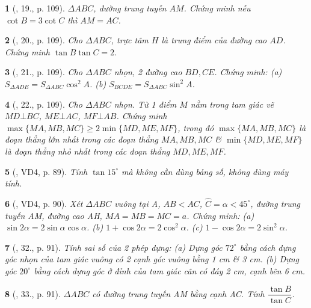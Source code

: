 \documentclass{article}
\newtheorem{baitoan}{}
\begin{document}
\begin{baitoan}[\cite{Tuyen_Toan_9_old}, 19., p. 109]
	$\Delta ABC$, đường trung tuyến $AM$. Chứng minh nếu $\cot B = 3\cot C$ thì $AM = AC$.
\end{baitoan}

\begin{baitoan}[\cite{Tuyen_Toan_9_old}, 20., p. 109]
	Cho $\Delta ABC$, trực tâm $H$ là trung điểm của đường cao $AD$. Chứng minh $\tan B\tan C = 2$.
\end{baitoan}

\begin{baitoan}[\cite{Tuyen_Toan_9_old}, 21., p. 109]
	Cho $\Delta ABC$ nhọn, 2 đường cao $BD,CE$. Chứng minh: (a) $S_{\Delta ADE} = S_{\Delta ABC}\cos^2A$. (b) $S_{BCDE} = S_{\Delta ABC}\sin^2A$.
\end{baitoan}

\begin{baitoan}[\cite{Tuyen_Toan_9_old}, 22., p. 109]
	Cho $\Delta ABC$ nhọn. Từ 1 điểm $M$ nằm trong tam giác vẽ $MD\bot BC$, $ME\bot AC$, $MF\bot AB$. Chứng minh $\max\{MA,MB,MC\}\ge2\min\{MD,ME,MF\}$, trong đó $\max\{MA,MB,MC\}$ là đoạn thẳng lớn nhất trong các đoạn thẳng $MA,MB,MC$ \& $\min\{MD,ME,MF\}$ là đoạn thẳng nhỏ nhất trong các đoạn thẳng $MD,ME,MF$.
\end{baitoan}

\begin{baitoan}[\cite{Binh_Toan_9_tap_1}, VD4, p. 89]
	Tính $\tan15^\circ$ mà không cần dùng bảng số, không dùng máy tính.
\end{baitoan}

\begin{baitoan}[\cite{Binh_Toan_9_tap_1}, VD4, p. 90]
	Xét $\Delta ABC$ vuông tại A, $AB < AC$, $\widehat{C} = \alpha  < 45^\circ$, đường trung tuyến AM, đường cao AH, $MA = MB = MC = a$. Chứng minh: (a) $\sin2\alpha = 2\sin\alpha\cos\alpha$. (b) $1 + \cos2\alpha = 2\cos^2\alpha$. (c) $1 - \cos2\alpha = 2\sin^2\alpha$.
\end{baitoan}

\begin{baitoan}[\cite{Binh_Toan_9_tap_1}, 32., p. 91]
	Tính sai số của 2 phép dựng: (a) Dựng góc $72^\circ$ bằng cách dựng góc nhọn của tam giác vuông có 2 cạnh góc vuông bằng {\rm1 cm} \& {\rm3 cm}. (b) Dựng góc $20^\circ$ bằng cách dựng góc ở đỉnh của tam giác cân có đáy {\rm2 cm}, cạnh bên {\rm6 cm}.
\end{baitoan}

\begin{baitoan}[\cite{Binh_Toan_9_tap_1}, 33., p. 91]
	$\Delta ABC$ có đường trung tuyến AM bằng cạnh AC. Tính $\dfrac{\tan B}{\tan C}$.
\end{baitoan}
\end{document}

